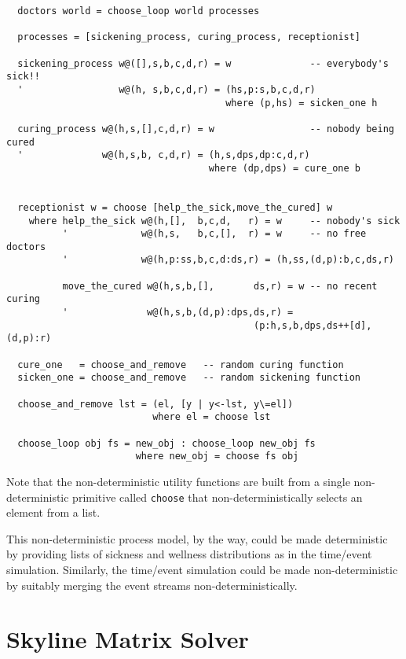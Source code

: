 \begin{verbatim}
  doctors world = choose_loop world processes

  processes = [sickening_process, curing_process, receptionist]

  sickening_process w@([],s,b,c,d,r) = w              -- everybody's sick!!
  '                 w@(h, s,b,c,d,r) = (hs,p:s,b,c,d,r)
                                       where (p,hs) = sicken_one h

  curing_process w@(h,s,[],c,d,r) = w                 -- nobody being cured
  '              w@(h,s,b, c,d,r) = (h,s,dps,dp:c,d,r)
                                    where (dp,dps) = cure_one b
                         

  receptionist w = choose [help_the_sick,move_the_cured] w
    where help_the_sick w@(h,[],  b,c,d,   r) = w     -- nobody's sick
          '             w@(h,s,   b,c,[],  r) = w     -- no free doctors
          '             w@(h,p:ss,b,c,d:ds,r) = (h,ss,(d,p):b,c,ds,r)

          move_the_cured w@(h,s,b,[],       ds,r) = w -- no recent curing
          '              w@(h,s,b,(d,p):dps,ds,r) = 
                                            (p:h,s,b,dps,ds++[d],(d,p):r)

  cure_one   = choose_and_remove   -- random curing function
  sicken_one = choose_and_remove   -- random sickening function

  choose_and_remove lst = (el, [y | y<-lst, y\=el])
                          where el = choose lst

  choose_loop obj fs = new_obj : choose_loop new_obj fs
                       where new_obj = choose fs obj
\end{verbatim}
Note that the non-deterministic utility functions are built from a
single non-deterministic primitive called {\tt choose} that
non-deterministically selects an element from a list.

This non-deterministic process model, by the way, could be made
deterministic by providing lists of sickness and wellness
distributions as in the time/event simulation.  Similarly, the
time/event simulation could be made non-deterministic by suitably
merging the event streams non-deterministically.

\section{Skyline Matrix Solver}

